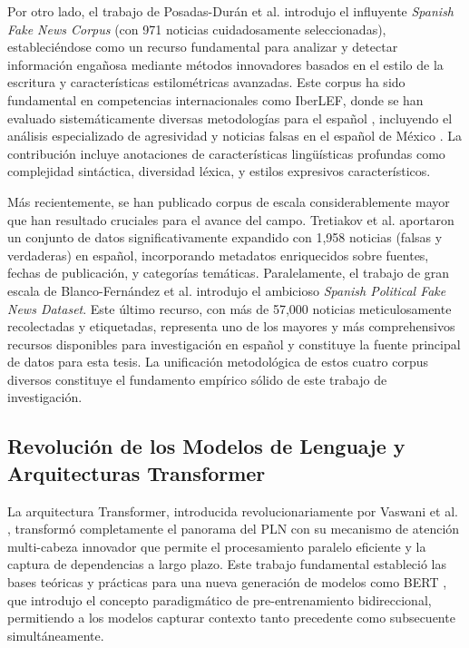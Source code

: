 Por otro lado, el trabajo de Posadas-Durán et al. \cite{posadas2019detection} introdujo el influyente \textit{Spanish Fake News Corpus} (con 971 noticias cuidadosamente seleccionadas), estableciéndose como un recurso fundamental para analizar y detectar información engañosa mediante métodos innovadores basados en el estilo de la escritura y características estilométricas avanzadas. Este corpus ha sido fundamental en competencias internacionales como IberLEF, donde se han evaluado sistemáticamente diversas metodologías para el español \cite{gomez2021overview}, incluyendo el análisis especializado de agresividad y noticias falsas en el español de México \cite{aragon2020overview}. La contribución incluye anotaciones de características lingüísticas profundas como complejidad sintáctica, diversidad léxica, y estilos expresivos característicos.

Más recientemente, se han publicado corpus de escala considerablemente mayor que han resultado cruciales para el avance del campo. Tretiakov et al. \cite{tretiakov2022detection} aportaron un conjunto de datos significativamente expandido con 1,958 noticias (falsas y verdaderas) en español, incorporando metadatos enriquecidos sobre fuentes, fechas de publicación, y categorías temáticas. Paralelamente, el trabajo de gran escala de Blanco-Fernández et al. \cite{blanco2024enhancing} introdujo el ambicioso \textit{Spanish Political Fake News Dataset}. Este último recurso, con más de 57,000 noticias meticulosamente recolectadas y etiquetadas, representa uno de los mayores y más comprehensivos recursos disponibles para investigación en español y constituye la fuente principal de datos para esta tesis. La unificación metodológica de estos cuatro corpus diversos constituye el fundamento empírico sólido de este trabajo de investigación.

\subsection{Revolución de los Modelos de Lenguaje y Arquitecturas Transformer}

La arquitectura Transformer, introducida revolucionariamente por Vaswani et al. \cite{vaswani2017attention}, transformó completamente el panorama del PLN con su mecanismo de atención multi-cabeza innovador que permite el procesamiento paralelo eficiente y la captura de dependencias a largo plazo. Este trabajo fundamental estableció las bases teóricas y prácticas para una nueva generación de modelos como BERT \cite{devlin2018bert}, que introdujo el concepto paradigmático de pre-entrenamiento bidireccional, permitiendo a los modelos capturar contexto tanto precedente como subsecuente simultáneamente.

